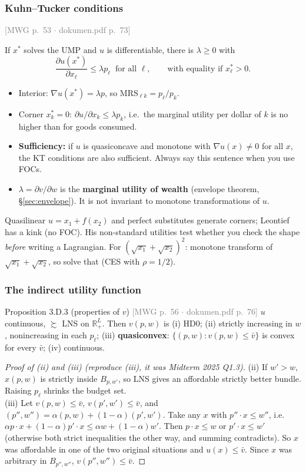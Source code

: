\documentclass[11pt]{article}
\newcommand{\R}{\mathbb{R}}
\newcommand{\pref}{\succsim}
\newcommand{\mwg}[2]{\hfill{\small\textcolor{gray}{[MWG p.~#1 $\cdot$ dokumen.pdf p.~#2]}}}
\begin{document}
\subsubsection{Kuhn--Tucker conditions}\label{sec:kt}
\mwg{53}{73}\par
If $x^*$ solves the UMP and $u$ is differentiable, there is $\lambda\ge0$ with
\[
\frac{\partial u(x^*)}{\partial x_\ell}\le\lambda p_\ell\ \text{ for all }\ell,\qquad\text{with equality if }x^*_\ell>0 .
\]
\begin{itemize}
\item Interior: $\nabla u(x^*)=\lambda p$, so $\mathrm{MRS}_{\ell k}=p_\ell/p_k$.
\item Corner $x^*_k=0$: $\partial u/\partial x_k\le\lambda p_k$, i.e.\ the marginal utility per dollar of $k$ is no higher than for goods consumed.
\item \textbf{Sufficiency:} if $u$ is quasiconcave and monotone with $\nabla u(x)\ne0$ for all $x$, the KT conditions are also sufficient. Always say this sentence when you use FOCs.
\item $\lambda=\partial v/\partial w$ is the \textbf{marginal utility of wealth} (envelope theorem, \S\ref{sec:envelope}). It is not invariant to monotone transformations of $u$.
\end{itemize}

\begin{exam}
Quasilinear $u=x_1+f(x_2)$ and perfect substitutes generate corners; Leontief has a kink (no FOC). His non-standard utilities test whether you check the shape \emph{before} writing a Lagrangian. For $(\sqrt{x_1}+\sqrt{x_2})^2$: monotone transform of $\sqrt{x_1}+\sqrt{x_2}$, so solve that (CES with $\rho=1/2$).
\end{exam}

\subsubsection{The indirect utility function}\label{sec:v}
\begin{prop}{Proposition 3.D.3 (properties of $v$) \mwg{56}{76}}
$u$ continuous, $\pref$ LNS on $\R^L_+$. Then $v(p,w)$ is
(i) HD0; (ii) strictly increasing in $w$, nonincreasing in each $p_\ell$; (iii) \textbf{quasiconvex}: $\{(p,w):v(p,w)\le\bar v\}$ is convex for every $\bar v$; (iv) continuous.
\end{prop}
\begin{proof}[Proof of (ii) and (iii) (reproduce (iii), it was Midterm 2025 Q1.3)]
(ii) If $w'>w$, $x(p,w)$ is strictly inside $B_{p,w'}$, so LNS gives an affordable strictly better bundle. Raising $p_\ell$ shrinks the budget set.\\
(iii) Let $v(p,w)\le\bar v$, $v(p',w')\le\bar v$, and $(p'',w'')=\alpha(p,w)+(1-\alpha)(p',w')$. Take any $x$ with $p''\cdot x\le w''$, i.e.\ $\alpha p\cdot x+(1-\alpha)p'\cdot x\le\alpha w+(1-\alpha)w'$. Then $p\cdot x\le w$ or $p'\cdot x\le w'$ (otherwise both strict inequalities the other way, and summing contradicts). So $x$ was affordable in one of the two original situations and $u(x)\le\bar v$. Since $x$ was arbitrary in $B_{p'',w''}$, $v(p'',w'')\le\bar v$.
\end{proof}
\end{document}
